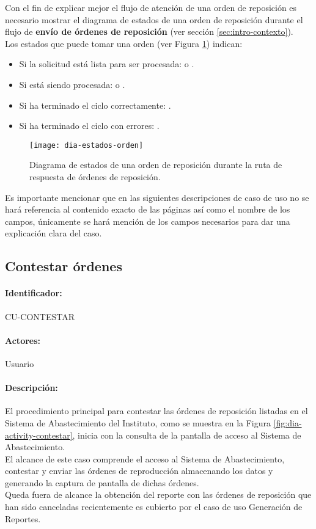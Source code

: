 Con el fin de explicar mejor el flujo de atención de una orden de reposición es necesario mostrar el diagrama de estados de una orden de reposición durante el flujo de \textbf{envío de órdenes de reposición} (ver sección \ref{sec:intro-contexto}).\\
Los estados que puede tomar una orden (ver Figura \ref{fig:dia-estados-orden}) indican:
\begin{itemize}
  \item Si la solicitud está lista para ser procesada:  o .
  \item Si está siendo procesada:  o .
  \item Si ha terminado el ciclo correctamente: .
  \item Si ha terminado el ciclo con errores: .
\end{itemize} 

\begin{figure}[h]
  \centering
  \texttt{[image: dia-estados-orden]} 
  \caption{Diagrama de estados de una orden de reposición durante la ruta de respuesta de órdenes de reposición.}
  \label{fig:dia-estados-orden}
\end{figure}

Es importante mencionar que en las siguientes descripciones de caso de uso no se hará referencia al contenido exacto de las páginas así como el nombre de los campos, únicamente se hará mención de los campos necesarios para dar una explicación clara del caso.

\subsection{Contestar órdenes}\label{cu-contestar}
\paragraph{Identificador:}
CU-CONTESTAR
\paragraph{Actores:}
Usuario
\paragraph{Descripción:}
El procedimiento principal para contestar las órdenes de reposición listadas en el Sistema de Abastecimiento del Instituto, como se muestra en la Figura \ref{fig:dia-activity-contestar}, inicia con la consulta de la pantalla de acceso al Sistema de Abastecimiento.\\
El alcance de este caso comprende el acceso al Sistema de Abastecimiento, contestar y enviar las órdenes de reproducción almacenando los datos y generando la captura de pantalla de dichas órdenes.\\
Queda fuera de alcance la obtención del reporte con las órdenes de reposición que han sido canceladas recientemente es cubierto por el caso de uso Generación de Reportes.
